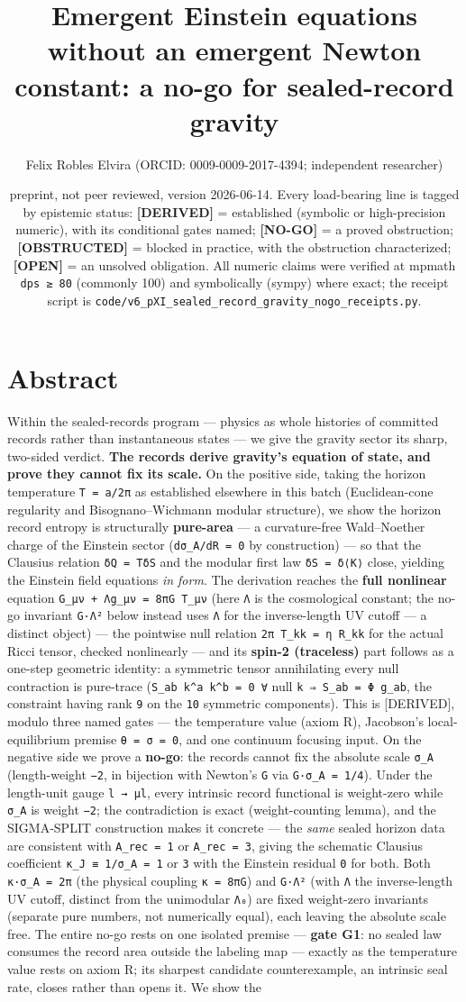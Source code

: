 \documentclass[11pt]{article}
\title{Emergent Einstein equations without an emergent Newton constant: a no-go for sealed-record gravity}
\author{Felix Robles Elvira (ORCID: 0009-0009-2017-4394; independent researcher)}
\date{\small preprint, not peer reviewed, version 2026-06-14. Every load-bearing line is tagged by epistemic status: \textbf{[DERIVED]} = established (symbolic or high-precision numeric), with its conditional gates named; \textbf{[NO-GO]} = a proved obstruction; \textbf{[OBSTRUCTED]} = blocked in practice, with the obstruction characterized; \textbf{[OPEN]} = an unsolved obligation. All numeric claims were verified at mpmath \texttt{dps ≥ 80} (commonly 100) and symbolically (sympy) where exact; the receipt script is \texttt{code/v6\_pXI\_sealed\_record\_gravity\_nogo\_receipts.py}.}
\begin{document}
\maketitle

\section*{Abstract}
Within the sealed-records program — physics as whole histories of committed records rather than instantaneous states — we give the gravity sector its sharp, two-sided verdict. \textbf{The records derive gravity's equation of state, and prove they cannot fix its scale.} On the positive side, taking the horizon temperature \texttt{T = a/2π} as established elsewhere in this batch (Euclidean-cone regularity and Bisognano–Wichmann modular structure), we show the horizon record entropy is structurally \textbf{pure-area} — a curvature-free Wald–Noether charge of the Einstein sector (\texttt{dσ\_A/dR = 0} by construction) — so that the Clausius relation \texttt{δQ = TδS} and the modular first law \texttt{δS = δ⟨K⟩} close, yielding the Einstein field equations \emph{in form}. The derivation reaches the \textbf{full nonlinear} equation \texttt{G\_μν + Λg\_μν = 8πG T\_μν} (here \texttt{Λ} is the cosmological constant; the no-go invariant \texttt{G·Λ²} below instead uses \texttt{Λ} for the inverse-length UV cutoff — a distinct object) — the pointwise null relation \texttt{2π T\_kk = η R\_kk} for the actual Ricci tensor, checked nonlinearly — and its \textbf{spin-2 (traceless)} part follows as a one-step geometric identity: a symmetric tensor annihilating every null contraction is pure-trace (\texttt{S\_ab k\textasciicircum{}a k\textasciicircum{}b = 0 ∀} null \texttt{k ⇒ S\_ab = Φ g\_ab}, the constraint having rank \texttt{9} on the \texttt{10} symmetric components). This is [DERIVED], modulo three named gates — the temperature value (axiom R), Jacobson's local-equilibrium premise \texttt{θ = σ = 0}, and one continuum focusing input. On the negative side we prove a \textbf{no-go}: the records cannot fix the absolute scale \texttt{σ\_A} (length-weight \texttt{−2}, in bijection with Newton's \texttt{G} via \texttt{G·σ\_A = 1/4}). Under the length-unit gauge \texttt{l → μl}, every intrinsic record functional is weight-zero while \texttt{σ\_A} is weight \texttt{−2}; the contradiction is exact (weight-counting lemma), and the SIGMA-SPLIT construction makes it concrete — the \emph{same} sealed horizon data are consistent with \texttt{A\_rec = 1} or \texttt{A\_rec = 3}, giving the schematic Clausius coefficient \texttt{κ\_J ≡ 1/σ\_A = 1} or \texttt{3} with the Einstein residual \texttt{0} for both. Both \texttt{κ·σ\_A = 2π} (the physical coupling \texttt{κ = 8πG}) and \texttt{G·Λ²} (with \texttt{Λ} the inverse-length UV cutoff, distinct from the unimodular \texttt{Λ₀}) are fixed weight-zero invariants (separate pure numbers, not numerically equal), each leaving the absolute scale free. The entire no-go rests on one isolated premise — \textbf{gate G1}: no sealed law consumes the record area outside the labeling map — exactly as the temperature value rests on axiom R; its sharpest candidate counterexample, an intrinsic seal rate, closes rather than opens it. We show the 
\end{document}
